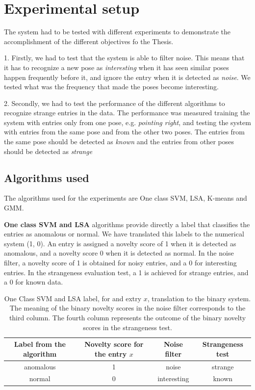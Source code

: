 \section{Experimental setup}

The system had to be tested with different experiments to demonstrate the accomplishment of the different objectives fo the Thesis. 

1. Firstly, we had to test that the system is able to filter noise. This means that it has to recognize a new pose as \emph{interesting} when it has seen similar poses happen frequently before it, and ignore the entry when it is detected as \emph{noise}. We tested what was the frequency that made the poses become interesting.

2. Secondly, we had to test the performance of the different algorithms to recognize strange entries in the data. The performance was measured training the system with entries only from one pose, e.g. \emph{pointing right}, and testing the system with entries from the same pose and from the other two poses. The entries from the same pose should be detected as \emph{known} and the entries from other poses should be detected as \emph{strange}

\subsection{Algorithms used} \label{4.4.1}

The algorithms used for the experiments are One class SVM, LSA, K-means and GMM.

\textbf{One class SVM and LSA} algorithms provide directly a label that classifies the entries as anomalous or normal. We have translated this labels to the numerical system (1, 0). An entry is assigned a novelty score of 1 when it is detected as anomalous, and a novelty score 0 when it is detected as normal. In the noise filter, a novelty score of 1 is obtained for noisy entries, and a 0 for interesting entries. In the strangeness evaluation test, a 1 is achieved for strange entries, and a 0 for known data. 

\begin{table}[h]
    \begin{tabular}{ c c c c}
    \hline
    Label from the algorithm & Novelty score for the entry $x$ & Noise filter & Strangeness test \\ 
    \hline
    anomalous & 1 & noise & strange \\
    normal & 0 & interesting & known \\
    \hline
    \end{tabular}
    \centering
    \caption[One Class SVM and LSA label interpretation]{One Class SVM and LSA label, for and extry $x$, translation to the binary system. The meaning of the binary novelty scores in the noise filter corresponds to the third column. The fourth column represents the outcome of the binary novelty scores in the strangeness test.}
\end{table}  


